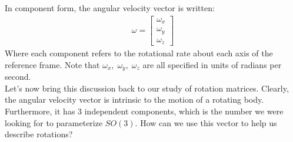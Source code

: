 \documentclass[oneside]{book}
\begin{document}
In component form, the angular velocity vector is written:
\begin{align}
    \omega = \begin{bmatrix}
    \omega_x\\
    \omega_y\\
    \omega_z
    \end{bmatrix}
\end{align}
Where each component refers to the rotational rate about each axis of the reference frame. Note that $\omega_x, \; \omega_y, \; \omega_z$ are all specified in units of radians per second.\\
Let's now bring this discussion back to our study of rotation matrices. Clearly, the angular velocity vector is intrinsic to the motion of a rotating body. Furthermore, it has 3 independent components, which is the number we were looking for to parameterize $SO(3)$. How can we use this vector to help us describe rotations?
\end{document}
